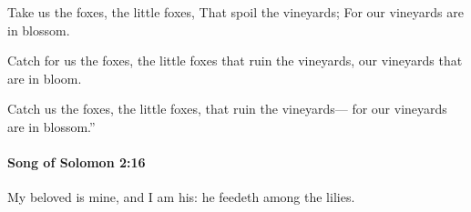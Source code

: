 			\begin{versebox}
					\item[BHS] 
					\item[LXX] 
					\item[ASV] Take us the foxes, the little foxes, That spoil the vineyards; For our vineyards are in blossom.
					\item[NIV] Catch for us the foxes, the little foxes that ruin the vineyards, our vineyards that are in bloom.
					\item[NRSV] Catch us the foxes, the little foxes, that ruin the vineyards— for our vineyards are in blossom.”
			\end{versebox}

		\paragraph{Song of Solomon 2:16} %
			\label{SONGOFSOLOMON-2-16}

			My beloved is mine, and I am his: he feedeth among the lilies.


